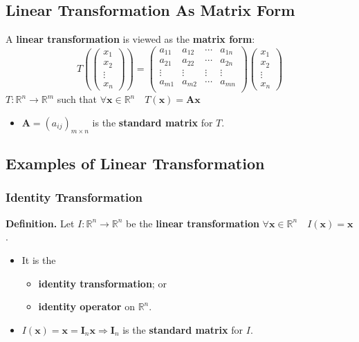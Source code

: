 \documentclass[../ma2001_notes.tex]{subfiles}
\begin{document}
\subsection{Linear Transformation As Matrix Form}
A \textbf{linear transformation} is viewed as the \textbf{matrix form}:
\[T\left(\begin{pmatrix}
	x_1 \\ x_2 \\ \vdots \\ x_n
\end{pmatrix}\right)=\begin{pmatrix}
	a_{11} & a_{12} & \cdots & a_{1n} \\
	a_{21} & a_{22} & \cdots & a_{2n} \\
	\vdots & \vdots & \vdots & \vdots \\
	a_{m1} & a_{m2} & \cdots & a_{mn} \\
\end{pmatrix}\begin{pmatrix}
	x_1 \\ x_2 \\ \vdots \\ x_n
\end{pmatrix}\]
\(T:\mathbb{R}^n\to\mathbb{R}^m\) such that \(\forall\bm{x}\in\mathbb{R}^n\quad T(\bm{x})=\bm{Ax}\)
\begin{itemize}
	\item\(\bm{A}=(a_{ij})_{m\times n}\) is the \textbf{standard matrix} for \(T\).
\end{itemize}

\subsection{Examples of Linear Transformation}
\subsubsection{Identity Transformation}
\textbf{Definition.} Let \(I:\mathbb{R}^n\to\mathbb{R}^n\) be the \textbf{linear transformation} \(\forall\bm{x}\in\mathbb{R}^n\quad I(\bm{x})=\bm{x}\).
\begin{itemize}
	\item It is the
	\begin{itemize}
		\item\textbf{identity transformation}; or
		\item\textbf{identity operator} on \(\mathbb{R}^n\).
	\end{itemize}
	\item\(I(\bm{x})=\bm{x}=\bm{I}_n\bm{x}\Rightarrow\bm{I}_n\) is the \textbf{standard matrix} for \(I\).
\end{itemize}
\end{document}
